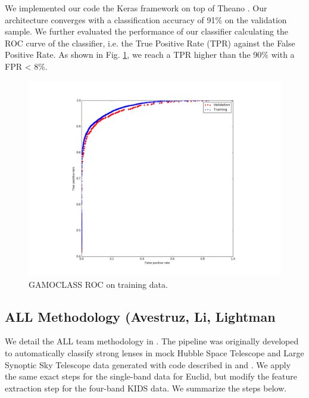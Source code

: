 \documentclass[useAMS,usenatbib]{mnras}
\begin{document}
We implemented our code the Keras framework \citet{Chollet_2015} on top of Theano \citet{Bastien_2012}.
Our architecture converges with a classification accuracy of 91\% on the validation sample. We further evaluated the performance of our classifier calculating the ROC curve of the classifier, i.e. the True Positive Rate (TPR) against the False Positive Rate. As shown in Fig. \ref{Fig2_gamoclass}, we reach a TPR higher than the 90\% with a FPR < 8\%.

\begin{figure}
  \centering
      \includegraphics[width=1\columnwidth]{figures/Fig2_gamoclass.pdf} 
  \caption{GAMOCLASS ROC on training data.}
 \label{Fig2_gamoclass}
\end{figure}

\subsection{ALL Methodology (Avestruz, Li, Lightman}

We detail the ALL team methodology in \citet{avestruz_etal17}. The
pipeline was originally developed to automatically classify strong
lenses in mock Hubble Space Telescope and Large Synoptic Sky Telescope
data generated with code described in \citet{li_etal16} and
\citet{collett_15}.  We apply the same exact steps for the single-band
data for Euclid, but modify the feature extraction step for the
four-band KIDS data.  We summarize the steps below.
\end{document}
